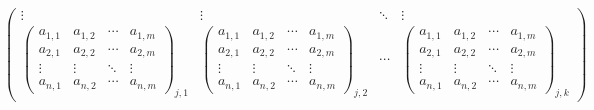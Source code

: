 \documentclass[a4paper]{article}
\begin{document}
\[\begin{pmatrix}
        \vdots  & \vdots  & \ddots & \vdots  \\
        {\begin{pmatrix} a_{1,1} & a_{1,2} & \cdots & a_{1,m} \\ a_{2,1} & a_{2,2} & \cdots & a_{2,m} \\ \vdots  & \vdots  & \ddots & \vdots  \\ a_{n,1} & a_{n,2} & \cdots & a_{n,m} \end{pmatrix}}_{j,1} & {\begin{pmatrix} a_{1,1} & a_{1,2} & \cdots & a_{1,m} \\ a_{2,1} & a_{2,2} & \cdots & a_{2,m} \\ \vdots  & \vdots  & \ddots & \vdots  \\ a_{n,1} & a_{n,2} & \cdots & a_{n,m} \end{pmatrix}}_{j,2} & \cdots & {\begin{pmatrix} a_{1,1} & a_{1,2} & \cdots & a_{1,m} \\ a_{2,1} & a_{2,2} & \cdots & a_{2,m} \\ \vdots  & \vdots  & \ddots & \vdots  \\ a_{n,1} & a_{n,2} & \cdots & a_{n,m} \end{pmatrix}}_{j,k}   
    \end{pmatrix}
\]
\end{document}
